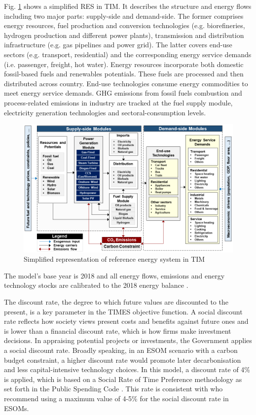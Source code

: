 \documentclass[gmd,manuscript]{copernicus}
\begin{document}
Fig. \ref{fig:TIM-RES} shows a simplified RES in TIM. It describes the structure and energy flows including two major parts: supply-side and demand-side. The former comprises energy resources, fuel production and conversion technologies (e.g. biorefineries, hydrogen production and different power plants), transmission and distribution infrastructure (e.g. gas pipelines and power grid). The latter covers end-use sectors (e.g. transport, residential) and the corresponding energy service demands (i.e. passenger, freight, hot water). Energy resources incorporate both domestic fossil-based fuels and renewables potentials. These fuels are processed and then distributed across country. End-use technologies consume energy commodities to meet energy service demands. GHG emissions from fossil fuels combustion and process-related emissions in industry are tracked at the fuel supply module, electricity generation technologies and sectoral-consumption levels. 

\begin{figure}[ht]
 \centering
 \includegraphics[scale=0.6]{figures/TIM_RES.png} 
 \caption{Simplified representation of reference energy system in TIM}
 \label{fig:TIM-RES}
\end{figure}

The model's base year is 2018 and all energy flows, emissions and energy technology stocks are calibrated to the 2018 energy balance \citep{SEAI2019}.

The discount rate, the degree to which future values are discounted to the present, is a key parameter in the TIMES objective function. A social discount rate reflects how society views present costs and benefits against future ones and is lower than a financial discount rate, which is how firms make investment decisions. In appraising potential projects or investments, the Government applies a social discount rate. Broadly speaking, in an ESOM scenario with a carbon budget constraint, a higher discount rate would promote later decarbonisation and less capital-intensive technology choices. In this model, a discount rate of 4\% is applied, which is based on a Social Rate of Time Preference methodology as set forth in the Public Spending Code \citep{OCallaghan2018}. This rate is consistent with \citet{Garcia-Gusano2016} who recommend using a maximum value of 4-5\% for the social discount rate in ESOMs. 
\end{document}
